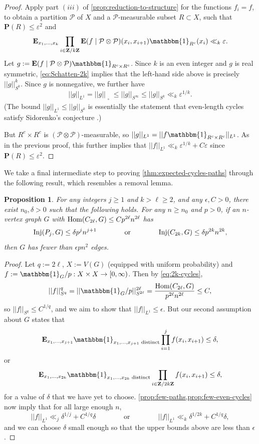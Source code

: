 \documentclass[reqno,11pt]{amsart}
\newtheorem{proposition}[theorem]{Proposition}
\theoremstyle{definition}
\theoremstyle{remark}
\numberwithin{equation}{section}
\newcommand{\Z}{\mathbf{Z}}
\renewcommand{\P}{\mathbf{P}}
\newcommand{\E}{\mathbf{E}}
\newcommand{\mP}{\mathcal{P}}
\newcommand{\one}{\mathbbm{1}}
\newcommand{\eps}{\varepsilon}
\newcommand{\sq}{_{\substack{ \\ \square}}}
\newcommand{\Hom}{\textnormal{Hom}}
\newcommand{\Inj}{\textnormal{Inj}}
\begin{document}
\begin{proof}
Apply part $(iii)$ of \cref{prop:reduction-to-structure} for the functions $f_{i} = f$, to obtain a partition $\mP$ of $X$ and a $\mP$-measurable subset $R \subset X$, such that $\P(R) \le \eps^2$ and
\[
    \E_{x_1,\ldots,x_k} \prod_{i \in \Z/k\Z} \E(f \mid \mP \otimes \mP)(x_i, x_{i+1}) \one_{R^c}(x_i) \ll_k \eps.
\]
Let $g := \E(f \mid \mP \otimes \mP) \one_{R^c \times R^c}$. Since $k$ is an even integer and $g$ is real symmetric, \cref{eq:Schatten-2k} implies that the left-hand side above is precisely $||g||_{S^k}^k$. Since $g$ is nonnegative, we further have
\[
    ||g||_{L^1} = ||g||\sq \le ||g||_{S^\infty} \le ||g||_{S^k} \ll_k \eps^{1/k}.
\]
(The bound $||g||_{L^1} \le ||g||_{S^k}$ is essentially the statement that even-length cycles satisfy Sidorenko's conjecture \cite{sidorenko1991inequalities}.)

But $R^c \times R^c$ is $(\mP \otimes \mP)$-measurable, so $||g||_{L^1} = ||f \one_{R^c \times R^c}||_{L^1}$. As in the previous proof, this further implies that $||f||_{L^1} \ll_k \eps^{1/k} + C\eps$ since $\P(R) \le \eps^2$.
\end{proof}

We take a final intermediate step to proving \cref{thm:expected-cycles-paths} through the following result, which resembles a removal lemma.

\begin{proposition}
\label{prop:graphs-transference-free}
For any integers $j \ge 1$ and $k > \ell \ge 2$, and any $\epsilon, C > 0$, there exist $n_0, \delta > 0$ such that the following holds. For any $n \ge n_0$ and $p > 0$, if an $n$-vertex graph $G$ with $\Hom(C_{2\ell},G) \le C p^{2\ell} n^{2\ell}$ has
\[
    \Inj(P_{j}, G) \le \delta p^{j} n^{j+1}
    \qquad\qquad \text{or} \qquad\qquad 
    \Inj(C_{2k}, G) \le \delta p^{2k} n^{2k},
\]
then $G$ has fewer than $\epsilon pn^2$ edges.
\end{proposition}

\begin{proof}
Let $q := 2\ell$, $X := V(G)$ (equipped with uniform probability) and $f := \one_{G}/p : X \times X \to [0, \infty)$. Then by \cref{eq:2k-cycles},
\[
    ||f||_{S^q}^q =  ||\one_{G} / p||_{S^{2\ell}}^{2\ell} = \frac{\Hom(C_{2\ell}, G)}{p^{2\ell}n^{2\ell}} \le C,
\]
so $||f||_{S^q} \le C^{1/q}$, and we aim to show that $||f||_{L^1} \le \epsilon$. But our second assumption about $G$ states that
\[
    \E_{x_1,\ldots,x_{j+1}} \one_{x_1,\ldots,x_{j+1} \textnormal{ distinct}} \prod_{i=1}^{j} f(x_i, x_{i+1}) \le \delta,
\]
or
\[
    \E_{x_1,\ldots,x_{2k}} \one_{x_1,\ldots,x_{2k} \text{ distinct}} \prod_{i \in \Z/2k\Z} f(x_i, x_{i+1}) \le \delta,
\]
for a value of $\delta$ that we have yet to choose. \cref{prop:few-paths,prop:few-even-cycles} now imply that for all large enough $n$,
\[
    ||f||_{L^1} \ll_j \delta^{1/j} + C^{1/q}\delta
    \qquad\qquad 
    \text{or}
    \qquad\qquad 
    ||f||_{L^1} \ll_k \delta^{1/2k} + C^{1/q}\delta,
\]
and we can choose $\delta$ small enough so that the upper bounds above are less than $\epsilon$.
\end{proof}
\end{document}
